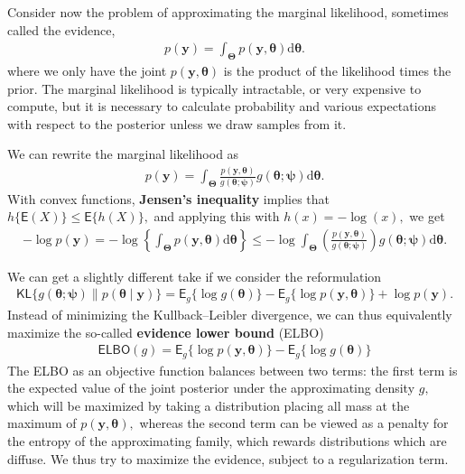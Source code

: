 \documentclass[
  11pt,
  letterpaper,
]{scrbook}
\theoremstyle{definition}
\theoremstyle{plain}
\theoremstyle{plain}
\theoremstyle{plain}
\theoremstyle{definition}
\theoremstyle{definition}
\theoremstyle{remark}
\begin{document}
Consider now the problem of approximating the marginal likelihood,
sometimes called the evidence, \begin{align*}
p(\boldsymbol{y}) = \int_{\boldsymbol{\Theta}} p(\boldsymbol{y}, \boldsymbol{\theta}) \mathrm{d} \boldsymbol{\theta}.
\end{align*} where we only have the joint
\(p(\boldsymbol{y}, \boldsymbol{\theta})\) is the product of the
likelihood times the prior. The marginal likelihood is typically
intractable, or very expensive to compute, but it is necessary to
calculate probability and various expectations with respect to the
posterior unless we draw samples from it.

We can rewrite the marginal likelihood as \begin{align*}
p(\boldsymbol{y}) = \int_{\boldsymbol{\Theta}}  \frac{p(\boldsymbol{y}, \boldsymbol{\theta})}{g(\boldsymbol{\theta};\boldsymbol{\psi})} g(\boldsymbol{\theta};\boldsymbol{\psi}) \mathrm{d} \boldsymbol{\theta}.
\end{align*} With convex functions, \textbf{Jensen's inequality} implies
that \(h\{\mathsf{E}(X)\} \leq \mathsf{E}\{h(X)\},\) and applying this
with \(h(x)=-\log(x),\) we get \begin{align*}
-\log p(\boldsymbol{y})  = -\log \left\{\int_{\boldsymbol{\Theta}} p(\boldsymbol{y}, \boldsymbol{\theta}) \mathrm{d} \boldsymbol{\theta}\right\} \leq - \log  \int_{\boldsymbol{\Theta}} \left(\frac{p(\boldsymbol{y}, \boldsymbol{\theta})}{g(\boldsymbol{\theta};\boldsymbol{\psi})}\right) g(\boldsymbol{\theta};\boldsymbol{\psi}) \mathrm{d} \boldsymbol{\theta}.
\end{align*}

We can get a slightly different take if we consider the reformulation
\begin{align*}
\mathsf{KL}\{g(\boldsymbol{\theta};\boldsymbol{\psi}) \parallel p(\boldsymbol{\theta} \mid \boldsymbol{y})\} = \mathsf{E}_{g}\{\log g(\boldsymbol{\theta})\} - \mathsf{E}_g\{\log p(\boldsymbol{y}, \boldsymbol{\theta})\} + \log p(\boldsymbol{y}).
\end{align*} Instead of minimizing the Kullback--Leibler divergence, we
can thus equivalently maximize the so-called \textbf{evidence lower
bound} (ELBO) \begin{align*}
\mathsf{ELBO}(g) = \mathsf{E}_g\{\log p(\boldsymbol{y}, \boldsymbol{\theta})\} - \mathsf{E}_{g}\{\log g(\boldsymbol{\theta})\}
\end{align*} The ELBO as an objective function balances between two
terms: the first term is the expected value of the joint posterior under
the approximating density \(g,\) which will be maximized by taking a
distribution placing all mass at the maximum of
\(p(\boldsymbol{y}, \boldsymbol{\theta}),\) whereas the second term can
be viewed as a penalty for the entropy of the approximating family,
which rewards distributions which are diffuse. We thus try to maximize
the evidence, subject to a regularization term.
\end{document}
